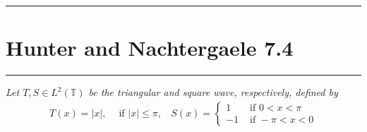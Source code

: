 \documentclass[fontsize=11pt]{article} %
\theoremstyle{plain}
\numberwithin{equation}{section} %
\numberwithin{figure}{section} %
\numberwithin{table}{section} %
\begin{document}
\begin{center}
    \noindent\rule{5cm}{1pt}
\end{center}
\section{\bf Hunter and Nachtergaele 7.4}
\begin{center}
    \noindent\rule{5cm}{1pt}
\end{center}

\emph{Let $T, S \in L^2(\mathbb{T})$ be the triangular and square wave, respectively, defined by}
\begin{align*}
    T(x) = |x|,\ \ \ \ \text{ if } |x| \leq \pi,\ \ \ \ S(x) = \begin{cases}
        1 & \text{ if } 0 < x < \pi \\
        -1 & \text{ if } -\pi < x < 0
    \end{cases}
\end{align*}
\end{document}
